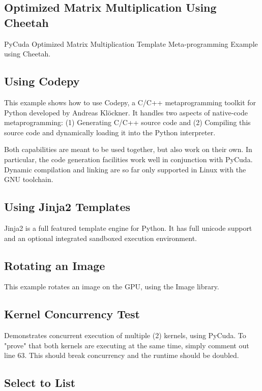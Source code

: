 \documentclass{article}
\begin{document}
\subsection{Optimized Matrix Multiplication Using Cheetah}

PyCuda Optimized Matrix Multiplication 
Template Meta-programming Example using Cheetah.

\subsection{Using Codepy}

This example shows how to use Codepy, a C/C++ metaprogramming toolkit for 
Python developed by Andreas Kl\"ockner. It handles two aspects of native-code 
metaprogramming: (1) Generating C/C++ source code and (2)
Compiling this source code and dynamically loading it into the Python interpreter.

Both capabilities are meant to be used together, but also work on their own. In particular, the code generation facilities work well in conjunction with PyCuda. Dynamic compilation and linking are so far only supported in Linux with the GNU toolchain.

\subsection{Using Jinja2 Templates}

Jinja2 is a full featured template engine for Python. It has full unicode support and
an optional integrated sandboxed execution environment.

\subsection{Rotating an Image}

This example rotates an image on the GPU, using the Image library.

\subsection{Kernel Concurrency Test}

Demonstrates concurrent execution of multiple (2) kernels, using PyCuda. 
To "prove" that both kernels are executing at the same time, simply comment 
out line 63. This should break concurrency and the runtime should be doubled.

\subsection{Select to List}
\end{document}
